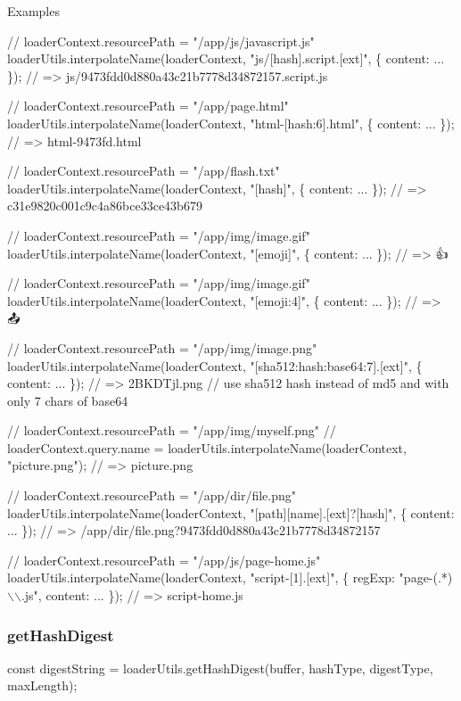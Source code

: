 Examples


\begin{DoxyCode}
// loaderContext.resourcePath = "/app/js/javascript.js"
loaderUtils.interpolateName(loaderContext, "js/[hash].script.[ext]", \{ content: ... \});
// => js/9473fdd0d880a43c21b7778d34872157.script.js

// loaderContext.resourcePath = "/app/page.html"
loaderUtils.interpolateName(loaderContext, "html-[hash:6].html", \{ content: ... \});
// => html-9473fd.html

// loaderContext.resourcePath = "/app/flash.txt"
loaderUtils.interpolateName(loaderContext, "[hash]", \{ content: ... \});
// => c31e9820c001c9c4a86bce33ce43b679

// loaderContext.resourcePath = "/app/img/image.gif"
loaderUtils.interpolateName(loaderContext, "[emoji]", \{ content: ... \});
// => 👍

// loaderContext.resourcePath = "/app/img/image.gif"
loaderUtils.interpolateName(loaderContext, "[emoji:4]", \{ content: ... \});
// => 🙍🏢📤🐝

// loaderContext.resourcePath = "/app/img/image.png"
loaderUtils.interpolateName(loaderContext, "[sha512:hash:base64:7].[ext]", \{ content: ... \});
// => 2BKDTjl.png
// use sha512 hash instead of md5 and with only 7 chars of base64

// loaderContext.resourcePath = "/app/img/myself.png"
// loaderContext.query.name =
loaderUtils.interpolateName(loaderContext, "picture.png");
// => picture.png

// loaderContext.resourcePath = "/app/dir/file.png"
loaderUtils.interpolateName(loaderContext, "[path][name].[ext]?[hash]", \{ content: ... \});
// => /app/dir/file.png?9473fdd0d880a43c21b7778d34872157

// loaderContext.resourcePath = "/app/js/page-home.js"
loaderUtils.interpolateName(loaderContext, "script-[1].[ext]", \{ regExp: "page-(.*)\(\backslash\)\(\backslash\).js", content: ... \});
// => script-home.js
\end{DoxyCode}


\subsubsection*{{\ttfamily get\+Hash\+Digest}}


\begin{DoxyCode}
const digestString = loaderUtils.getHashDigest(buffer, hashType, digestType, maxLength);
\end{DoxyCode}



